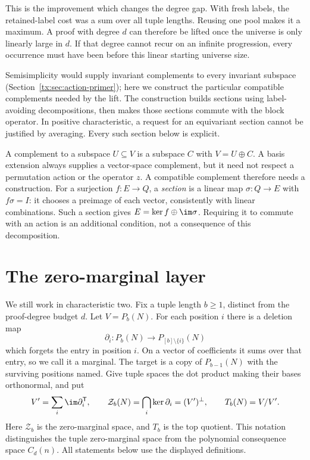 \documentclass[11pt,a4paper,oneside,openany]{book}
\theoremstyle{definition}\newtheorem{definition}[theorem]{Definition}
\theoremstyle{remark}\newtheorem{remark}[theorem]{Remark}
\numberwithin{equation}{chapter}
\begin{document}
This is the improvement which changes the degree gap. With fresh labels,
the retained-label cost was a sum over all tuple lengths. Reusing one
pool makes it a maximum. A proof with degree $d$ can therefore be lifted
once the universe is only linearly large in $d$. If that degree cannot
recur on an infinite progression, every occurrence must have been
before this linear starting universe size.

Semisimplicity would supply invariant complements to every invariant
subspace (Section~\ref{tx:sec:action-primer}); here we construct the
particular compatible complements needed by the lift.
The construction builds sections using label-avoiding decompositions,
then makes those sections commute with the block operator. In
positive characteristic, a request for an equivariant section cannot
be justified by averaging. Every such section below is explicit.

A complement to a subspace $U\subseteq V$ is a subspace $C$ with
$V=U\oplus C$. A basis extension always supplies a vector-space
complement, but it need not respect a permutation action or the
operator $z$. A compatible complement therefore needs a construction.
For a surjection $f:E\to Q$, a \emph{section} is a linear map
$\sigma:Q\to E$ with $f\sigma=I$: it chooses a preimage of each
vector, consistently with linear combinations. Such a section gives
$E=\ker f\oplus\im\sigma$. Requiring it to commute with an action
is an additional condition, not a consequence of this decomposition.

\section{The zero-marginal layer}\label{tx:sec:layers}
We still work in characteristic two. Fix a tuple length $b\ge1$, distinct from the proof-degree budget $d$. Let $V=P_b(N)$. For each position $i$ there is a deletion map
\[\partial_i:P_b(N)\longrightarrow P_{[b]\setminus\{i\}}(N)
\]
which forgets the entry in position $i$. On a vector of coefficients it sums over that entry, so we call it a marginal. The target is a copy of $P_{b-1}(N)$ with the surviving positions named. Give tuple spaces the dot product making their bases orthonormal, and put
\begin{equation}\label{tx:eq:anatomy}
V'=\sum_i\im\partial_i^{\mathsf T},\qquad
\mathcal Z_b(N)=\bigcap_i\ker\partial_i=(V')^\perp,\qquad T_b(N)=V/V'.
\end{equation}
Here $\mathcal Z_b$ is the zero-marginal space, and $T_b$ is the top quotient. This notation distinguishes the tuple zero-marginal space from the
polynomial consequence space $C_d(n)$. All statements below use the
displayed definitions.
\end{document}
